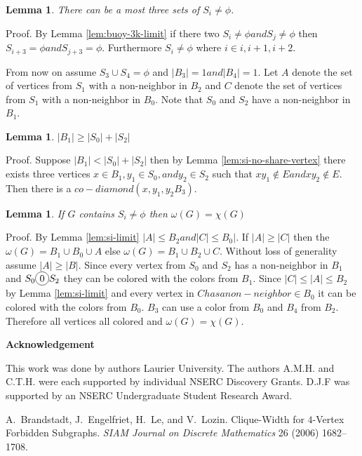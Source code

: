 \documentclass[12pt]{article}
\newcommand*\circled[1]{\tikz[baseline=(char.base)]{
            \node[shape=circle,draw,inner sep=2pt] (char) {#1};}}
\newtheorem{Lemma}[Theorem]{Lemma}
\begin{document}
\begin{Lemma}\label{lem:max-3-si}
There can be a most three sets of $S_i \neq \phi$. 
\end{Lemma}
\noindent {\it} Proof. By Lemma \ref{lem:buoy-3k-limit} if there two $S_i \neq \phi and S_j \neq \phi$ then  $S_{i+3} = \phi and S_{j+3} = \phi$. Furthermore $S_i \neq \phi$ where $i \in {i, i+1, i+2}$. 

From now on assume $S_3 \cup S_4 = \phi$ and $|B_3| = 1 and |B_4| = 1$. Let $A$ denote the set of vertices from $S_1$ with a non-neighbor in $B_2$ and $C$ denote the set of vertices from $S_1$ with a non-neighbor in $B_0$. Note that $S_0$ and $S_2$ have a non-neighbor in $B_1$.

\begin{Lemma}\label{lem:max-s0-s2}
$|B_1| \geq |S_0| + |S_2|$
\end{Lemma}
\noindent {\it} Proof. Suppose $|B_1| < |S_0| + |S_2|$ then by Lemma \ref{lem:si-no-share-vertex} there exists three vertices $x \in B_1, y_1 \in S_0, and y_2 \in S_2$ such that $xy_1 \not \in E and xy_2 \not \in E$. Then there is a $co-diamond (x,y_1, y_2B_3)$.

\begin{Lemma}\label{lem:omega-equals-chromatic}
If $G$ contains $S_i \neq \phi$ then $\omega(G) = \chi(G)$
\end{Lemma}
\noindent {\it} Proof. By Lemma \ref{lem:si-limit} $|A| \leq B_2 and |C| \leq B_0|$. If $|A| \geq |C|$ then the $\omega(G) = B_1 \cup B_0 \cup A$ else $\omega(G) = B_1 \cup B_2 \cup C$. Without loss of generality assume $|A| \geq |B|$. Since every vertex from $S_0$ and $S_2$ has a non-neighbor in $B_1$ and $S_0 \circled{0} S_2$ they can be colored with the colors from $B_1$. Since $|C| \leq |A| \leq B_2$ by Lemma \ref{lem:si-limit} and every vertex in $C has a non-neighbor \in B_0$ it can be colored with the colors from $B_0$. $B_3$ can use a color from $B_0$ and $B_4$ from $B_2$. Therefore all vertices all colored and $\omega(G) = \chi(G)$.

\begin{center}
{\bf Acknowledgement}
\end{center}
This work was done by authors  Laurier University. The authors A.M.H. and C.T.H. were each supported by individual NSERC Discovery Grants. D.J.F was supported by an NSERC Undergraduate Student Research Award.


\clearpage
\begin{thebibliography}{99}


    A.~Brandstadt, J.~Engelfriet, H.~Le, and V.~Lozin. Clique-Width for $4$-Vertex Forbidden Subgraphs.  {\sl SIAM
     Journal on Discrete Mathematics} 26 (2006) 1682--1708.

\end{thebibliography}
\end{document}
